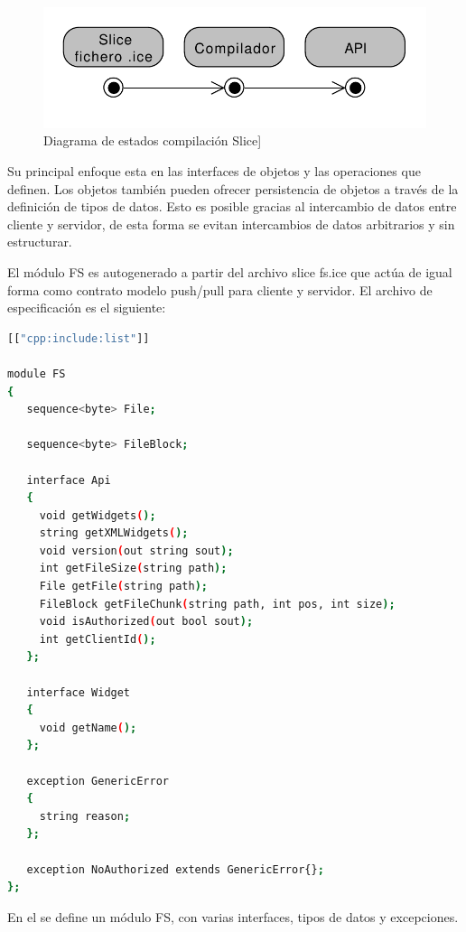 \begin{figure}[ht]
    \begin{center}
        \includegraphics[width=425px]{src/img/diagrams/freestation-states-slice-diagram.pdf}
        \caption[Diagrama de estados compilación Slice]
          {Diagrama de estados compilación Slice]}
        \label{fig:stateslice}
    \end{center}
\end{figure}

Su principal enfoque esta en las interfaces de objetos y las operaciones que
definen. Los objetos también pueden ofrecer persistencia de objetos a través de
la definición de tipos de datos. Esto es posible gracias al intercambio de datos
entre cliente y servidor, de esta forma se evitan intercambios de datos
arbitrarios y sin estructurar.

\newpage

El módulo FS es autogenerado a partir del archivo slice fs.ice que actúa de
igual forma como contrato modelo push/pull para cliente y servidor.
El archivo de especificación es el siguiente:

\begin{lstlisting}[language={bash}, texcl=false, caption={Especificación slice
para ICE}] [["cpp:include:list"]]

module FS 
{
   sequence<byte> File;
   
   sequence<byte> FileBlock;
   
   interface Api 
   {
     void getWidgets();
     string getXMLWidgets();
     void version(out string sout);
     int getFileSize(string path);
     File getFile(string path);
     FileBlock getFileChunk(string path, int pos, int size);
     void isAuthorized(out bool sout);
     int getClientId();
   };
   
   interface Widget 
   {
     void getName();
   };
   
   exception GenericError 
   {
     string reason;
   };
   
   exception NoAuthorized extends GenericError{};
};
\end{lstlisting}

En el se define un módulo FS, con varias interfaces, tipos de datos y
excepciones.

